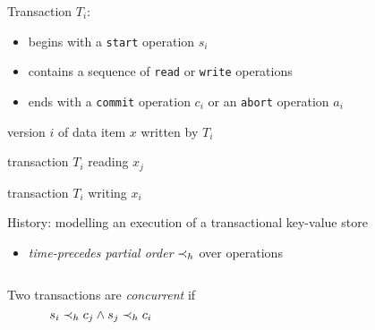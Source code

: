 \begin{frame}{}
  Transaction $T_i$:
  \begin{itemize}
    \item begins with a \texttt{start} operation $s_i$ 
    \item contains a sequence of \texttt{read} or \texttt{write} operations
    \item ends with a \texttt{commit} operation $c_i$ or an \texttt{abort} operation $a_i$
  \end{itemize}

  \pause
  \vspace{0.30cm}
  \begin{description}[$w_i(x_i)$:]
    \item[$x_i$:] version $i$ of data item $x$ written by $T_i$
    \item[$r_i(x_j)$:] transaction $T_i$ reading $x_j$
    \item[$w_i(x_i)$:] transaction $T_i$ writing $x_i$
  \end{description}
\end{frame}

\begin{frame}{}
  History: modelling an execution of a transactional key-value store
  \begin{itemize}
    \item \emph{time-precedes partial order} $\prec_{h}$ over operations
  \end{itemize}

  \pause
  \vspace{0.50cm}
  \begin{columns}
      Two transactions are \emph{concurrent} if
      \[
	s_i \prec_{h} c_j \land s_j \prec_{h} c_i
      \]
  \end{columns}
\end{frame}


